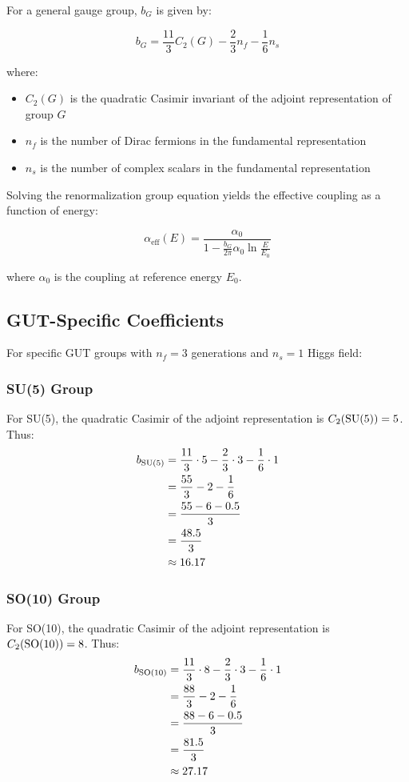 \documentclass[11pt]{article}
\begin{document}
For a general gauge group, $b_G$ is given by:

\begin{equation}
\boxed{
b_G = \frac{11}{3}C_2(G) - \frac{2}{3}n_f - \frac{1}{6}n_s
}
\end{equation}

where:
\begin{itemize}
\item $C_2(G)$ is the quadratic Casimir invariant of the adjoint representation of group $G$
\item $n_f$ is the number of Dirac fermions in the fundamental representation
\item $n_s$ is the number of complex scalars in the fundamental representation
\end{itemize}

Solving the renormalization group equation yields the effective coupling as a function of energy:

\begin{equation}
\boxed{
\alpha_{\mathrm{eff}}(E) = \frac{\alpha_0}{1 - \frac{b_G}{2\pi}\alpha_0\ln\frac{E}{E_0}}
}
\end{equation}

where $\alpha_0$ is the coupling at reference energy $E_0$.

\subsection{GUT-Specific Coefficients}

For specific GUT groups with $n_f=3$ generations and $n_s=1$ Higgs field:

\subsubsection{SU(5) Group}
For SU(5), the quadratic Casimir of the adjoint representation is $C_2(\mathrm{SU}(5)) = 5$. Thus:
\begin{align}
b_{\mathrm{SU}(5)} &= \frac{11}{3} \cdot 5 - \frac{2}{3} \cdot 3 - \frac{1}{6} \cdot 1\\
&= \frac{55}{3} - 2 - \frac{1}{6}\\
&= \frac{55 - 6 - 0.5}{3}\\
&= \frac{48.5}{3}\\
&\approx 16.17
\end{align}

\subsubsection{SO(10) Group}
For SO(10), the quadratic Casimir of the adjoint representation is $C_2(\mathrm{SO}(10)) = 8$. Thus:
\begin{align}
b_{\mathrm{SO}(10)} &= \frac{11}{3} \cdot 8 - \frac{2}{3} \cdot 3 - \frac{1}{6} \cdot 1\\
&= \frac{88}{3} - 2 - \frac{1}{6}\\
&= \frac{88 - 6 - 0.5}{3}\\
&= \frac{81.5}{3}\\
&\approx 27.17
\end{align}
\end{document}
